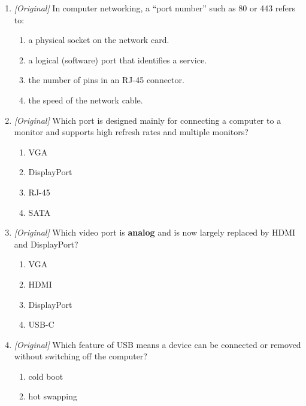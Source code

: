 \begin{enumerate}[label=\textbf{Q\arabic*.}, leftmargin=*]
\begin{enumerate}[label=\Roman*.]
    \item VGA carries both video and audio.
  \end{enumerate}
  \begin{enumerate}[label=\Alph*.]
    \item I and II only
    \item II and III only
    \item I and III only
    \item I, II, and III
  \end{enumerate}
\item \textit{[Original]} In computer networking, a ``port number'' such as
  80 or 443 refers to:
  \begin{enumerate}[label=\Alph*.]
    \item a physical socket on the network card.
    \item a logical (software) port that identifies a service.
    \item the number of pins in an RJ-45 connector.
    \item the speed of the network cable.
  \end{enumerate}
\item \textit{[Original]} Which port is designed mainly for connecting a
  computer to a monitor and supports high refresh rates and multiple
  monitors?
  \begin{enumerate}[label=\Alph*.]
    \item VGA
    \item DisplayPort
    \item RJ-45
    \item SATA
  \end{enumerate}
\item \textit{[Original]} Which video port is \textbf{analog} and is now
  largely replaced by HDMI and DisplayPort?
  \begin{enumerate}[label=\Alph*.]
    \item VGA
    \item HDMI
    \item DisplayPort
    \item USB-C
  \end{enumerate}
\item \textit{[Original]} Which feature of USB means a device can be
  connected or removed without switching off the computer?
  \begin{enumerate}[label=\Alph*.]
    \item cold boot
    \item hot swapping

\end{enumerate}
\end{enumerate}
